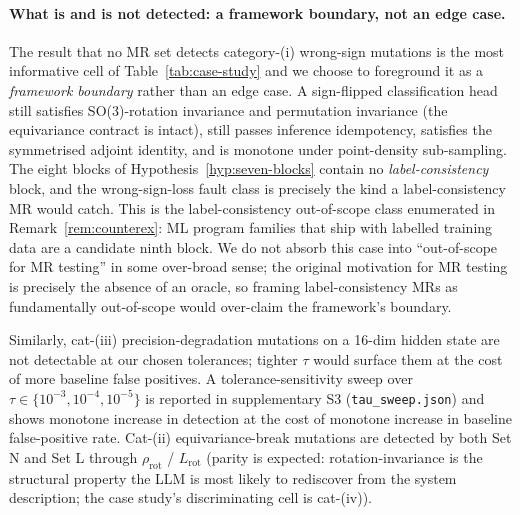 \documentclass[manuscript]{acmart}
\begin{document}
\paragraph{What is and is not detected: a framework boundary, not an edge case.}
The result that no MR set detects category-(i) wrong-sign mutations is the most informative cell of Table~\ref{tab:case-study} and we choose to foreground it as a \emph{framework boundary} rather than an edge case. A sign-flipped classification head still satisfies SO(3)-rotation invariance and permutation invariance (the equivariance contract is intact), still passes inference idempotency, satisfies the symmetrised adjoint identity, and is monotone under point-density sub-sampling. The eight blocks of Hypothesis~\ref{hyp:seven-blocks} contain no \emph{label-consistency} block, and the wrong-sign-loss fault class is precisely the kind a label-consistency MR would catch. This is the label-consistency out-of-scope class enumerated in Remark~\ref{rem:counterex}: ML program families that ship with labelled training data are a candidate ninth block. We do not absorb this case into ``out-of-scope for MR testing'' in some over-broad sense; the original motivation for MR testing is precisely the absence of an oracle, so framing label-consistency MRs as fundamentally out-of-scope would over-claim the framework's boundary.

Similarly, cat-(iii) precision-degradation mutations on a 16-dim hidden state are not detectable at our chosen tolerances; tighter $\tau$ would surface them at the cost of more baseline false positives. A tolerance-sensitivity sweep over $\tau \in \{10^{-3}, 10^{-4}, 10^{-5}\}$ is reported in supplementary S3 (\texttt{tau\_sweep.json}) and shows monotone increase in detection at the cost of monotone increase in baseline false-positive rate. Cat-(ii) equivariance-break mutations are detected by both Set N and Set L through $\rho_{\mathrm{rot}}$ / $L_{\mathrm{rot}}$ (parity is expected: rotation-invariance is the structural property the LLM is most likely to rediscover from the system description; the case study's discriminating cell is cat-(iv)).
\end{document}
